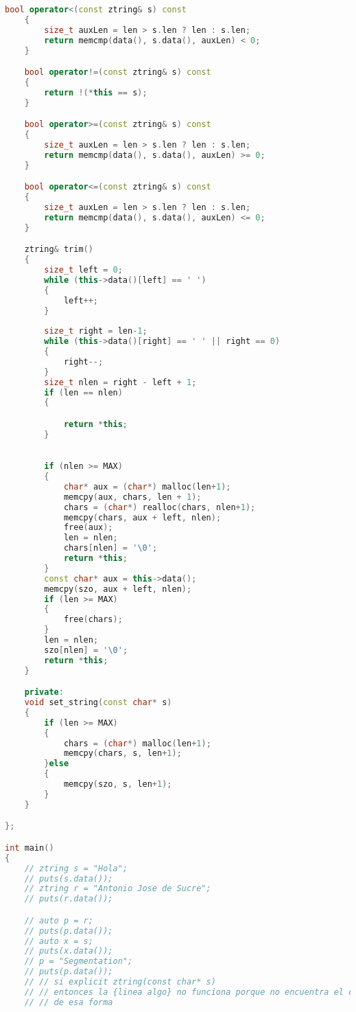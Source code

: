 \begin{lstlisting}[language=C++, caption={Ztring}]
    bool operator<(const ztring& s) const
    {
        size_t auxLen = len > s.len ? len : s.len;
        return memcmp(data(), s.data(), auxLen) < 0;
    }

    bool operator!=(const ztring& s) const
    {
        return !(*this == s);
    }

    bool operator>=(const ztring& s) const
    {
        size_t auxLen = len > s.len ? len : s.len;
        return memcmp(data(), s.data(), auxLen) >= 0;
    }

    bool operator<=(const ztring& s) const
    {
        size_t auxLen = len > s.len ? len : s.len;
        return memcmp(data(), s.data(), auxLen) <= 0;
    }

    ztring& trim()
    {
        size_t left = 0;
        while (this->data()[left] == ' ')
        {
            left++;
        }
        
        size_t right = len-1;
        while (this->data()[right] == ' ' || right == 0)
        {
            right--;
        }
        size_t nlen = right - left + 1;
        if (len == nlen)
        {

            return *this;
        }
        

        if (nlen >= MAX)
        {
            char* aux = (char*) malloc(len+1);
            memcpy(aux, chars, len + 1);
            chars = (char*) realloc(chars, nlen+1);
            memcpy(chars, aux + left, nlen);
            free(aux);
            len = nlen;
            chars[nlen] = '\0';
            return *this;
        }
        const char* aux = this->data();
        memcpy(szo, aux + left, nlen);
        if (len >= MAX)
        {
            free(chars);
        }
        len = nlen;
        szo[nlen] = '\0';
        return *this;
    }

    private:
    void set_string(const char* s)
    {
        if (len >= MAX)
        {
            chars = (char*) malloc(len+1);
            memcpy(chars, s, len+1);
        }else
        {
            memcpy(szo, s, len+1);
        }
    }

};

int main()
{
    // ztring s = "Hola";
    // puts(s.data());
    // ztring r = "Antonio Jose de Sucre";
    // puts(r.data());

    // auto p = r;
    // puts(p.data());
    // auto x = s;
    // puts(x.data());
    // p = "Segmentation";
    // puts(p.data());
    // // si explicit ztring(const char* s)
    // // entonces la {linea algo} no funciona porque no encuentra el compilador un constrcutor 
    // // de esa forma


\end{lstlisting}
